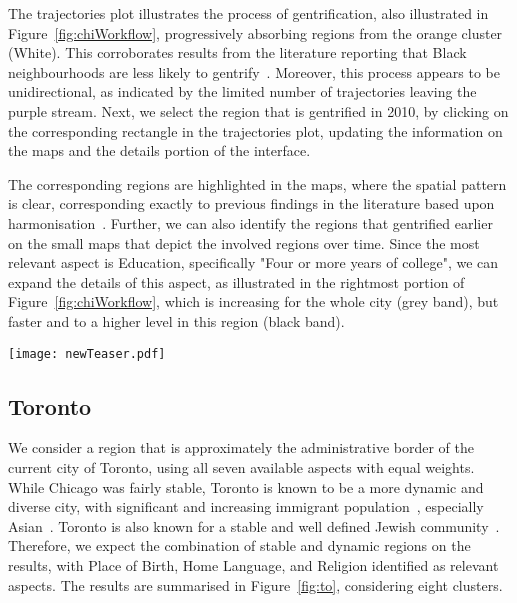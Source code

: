 The trajectories plot illustrates the process of gentrification, also
illustrated in Figure~\ref{fig:chiWorkflow}, progressively absorbing regions
from the orange cluster (White). This corroborates results from the literature
reporting that Black neighbourhoods are less likely to
gentrify~\citep{Hwang2014}. Moreover, this process appears to be unidirectional,
as indicated by the limited number of trajectories leaving the purple stream.
Next, we select the region that is gentrified in 2010, by clicking on the
corresponding rectangle in the trajectories plot, updating the information on
the maps and the details portion of the interface.

The corresponding regions are highlighted in the maps, where the spatial pattern
is clear, corresponding exactly to previous findings in the literature based
upon harmonisation~\citep{Hwang2014}. Further, we can also identify the regions
that gentrified earlier on the small maps that depict the involved regions over
time. Since the most relevant aspect is Education, specifically "Four or more
years of college", we can expand the details of this aspect, as illustrated in
the rightmost portion of Figure~\ref{fig:chiWorkflow}, which is increasing for
the whole city (grey band), but faster and to a higher level in this region
(black band).



\begin{figure*}
    \centering
 \texttt{[image: newTeaser.pdf]}
 \caption{Workflow to discover gentrification in Chicago: the purple cluster
 corresponds to high education / income. Its population is increasing over time,
 absorbing from the majority White cluster (orange). By selecting the purple
 cluster in 2010, the region is highlighted in the maps. The proportion of
 people with 4+ years of college is increasing in the whole city (grey IQRs),
 but significantly more in this region (black).\label{fig:chiWorkflow}}
\end{figure*}



\subsection{Toronto}

We consider a region that is approximately the administrative border of the
current city of Toronto, using all seven available aspects with equal weights.
While Chicago was fairly stable, Toronto is known to be a more dynamic and
diverse city, with significant and increasing immigrant
population~\citep{hulchanski2007three,Fong2011}, especially Asian~\citep{Fong2003}. 
Toronto is also known for a stable and well defined Jewish community~\citep{Harold2018, Fong2011}. Therefore, we expect the combination of stable and dynamic regions on the results, with Place of Birth,
Home Language, and Religion identified as relevant aspects. The results are
summarised in Figure~\ref{fig:to}, considering eight clusters.

